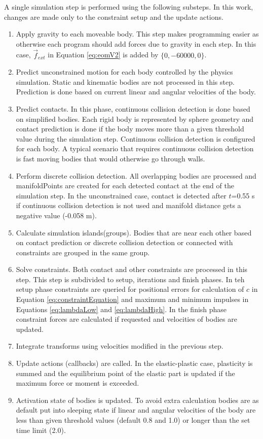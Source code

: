 A single simulation step is performed using the following substeps. 
In this work, changes are made only to the constraint setup and the update actions.
\begin{enumerate}
\item Apply gravity to each moveable body. 
This step makes programming easier as otherwise each program should add forces due to gravity in each step. 
In this case, $\vec{f}_{ext}$ in  Equation \ref{eq:eomV2} is added by $\lbrace{0,-60000,0}\rbrace$.
\item Predict unconstrained motion for each body controlled by the physics simulation.
Static and kinematic bodies are not processed in this step.
Prediction is done based on current linear and angular velocities of the body.
\item Predict contacts. In this phase, continuous collision detection is done based on simplified bodies. 
Each rigid body is represented by sphere geometry and contact prediction is done if 
the body moves more than a given threshold value during the simulation step. 
Continuous collision detection is configured for each body. 
A typical scenario that requires continuous collision detection is fast moving bodies that would otherwise go through walls.
\item Perform discrete collision detection. All overlapping bodies are processed and manifoldPoints are created for
each detected contact at the end of the simulation step. 
In the unconstrained case, contact is detected after $t$=0.55 s if 
continuous collision detection is not used and manifold distance gets a negative value (-0.058 m).
\item Calculate simulation islands(groups). Bodies that are near each other based 
on contact prediction or discrete collision detection
 or connected with constraints are grouped in the same group.
\item Solve constraints. Both contact and other constraints are processed in this step. 
 This step is subdivided to setup, iterations and finish phases. 
In teh setup phase constraints are queried for positional errors for calculation of $c$ in
Equation \ref{eq:constraintEquation} and maximum and minimum impulses in Equations \ref{eq:lambdaLow} and 
\ref{eq:lambdaHigh}.
In the finish phase constraint forces are calculated if requested and velocities of bodies are updated.
\item Integrate transforms using velocities modified in the previous step.
\item Update actions (callbacks) are called. 
In the elastic-plastic case, plasticity is summed and the equilibrium
point of the elastic part is updated if the maximum force or moment is exceeded.
\item Activation state of bodies is updated. 
To avoid extra calculation bodies are as default put into sleeping state if linear and angular velocities of
the body are less than
given threshold values (default 0.8 and 1.0) or longer than the set time limit (2.0).
\end{enumerate} 

